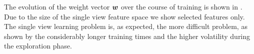The evolution of the weight vector $\Model$ over the course of
training is shown in . Due to the size of the
single view feature space we show selected features only. The
single view learning problem is, as expected, the more difficult
problem, as shown by the considerably longer training times and the
higher volatility during the exploration phase.

\newcommand{\ExtCompFrame}[3]{ \includegraphics[width=0.18\textwidth]
  {extra_comparison_frames/#1_frame#2_#3.jpg} }

\newcommand{\MviewRow}[2]{
  \ExtCompFrame{#1}{#2}{mview_depth} &
  \ExtCompFrame{#1}{#2}{mview_lbl} &
  \ExtCompFrame{#1}{#2}{iccv} &
  \ExtCompFrame{#1}{#2}{gt}
}

\newcommand{\SviewRow}[2]{
  \ExtCompFrame{#1}{#2}{sview_depth} &
  \ExtCompFrame{#1}{#2}{sview_lbl} &
  \ExtCompFrame{#1}{#2}{eccv} &
  \ExtCompFrame{#1}{#2}{gt}
}

